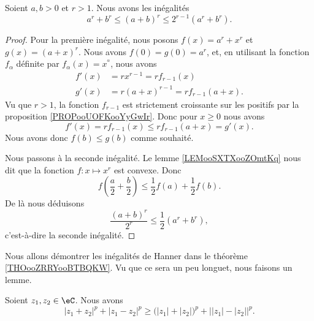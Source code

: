 	\begin{lemma}       \label{LEMooFKKEooDTypUd}
		Soient \( a,b>0\) et \( r>1\). Nous avons les inégalités
		\begin{equation}
			a^r+b^r\leq (a+b)^r\leq 2^{r-1}(a^r+b^r).
		\end{equation}
	\end{lemma}

	\begin{proof}
		Pour la première inégalité, nous posons \( f(x)=a^r+x^r\) et \( g(x)=(a+x)^r\). Nous avons \( f(0)=g(0)=a^r\), et, en utilisant la fonction \( f_{\alpha}\) définite par \( f_{\alpha}(x)=x^{^\alpha}\), nous avons
		\begin{subequations}
			\begin{align}
				f'(x) & =rx^{r-1} =rf_{r-1}(x)       \\
				g'(x) & =r(a+x)^{r-1}=rf_{r-1}(a+x).
			\end{align}
		\end{subequations}
		Vu que \( r>1\), la fonction \( f_{r-1}\) est strictement croissante sur les positifs par la proposition \ref{PROPooUOFKooYyGwIr}. Donc pour \( x\geq 0\) nous avons
		\begin{equation}
			f'(x)=rf_{r-1}(x)\leq rf_{r-1}(a+x)=g'(x).
		\end{equation}
		Nous avons donc \( f(b)\leq g(b)\) comme souhaité.

		Nous passons à la seconde inégalité. Le lemme \ref{LEMooSXTXooZOmtKq} nous dit que la fonction \( f\colon x\mapsto x^r \) est convexe. Donc
		\begin{equation}
			f\left( \frac{ a }{2}+\frac{ b }{2} \right)\leq\frac{ 1 }{2}f(a)+\frac{ 1 }{2}f(b).
		\end{equation}
		De là nous déduisons
		\begin{equation}
			\frac{ (a+b)^r }{ 2^r }\leq \frac{ 1 }{2}(a^r+b^r),
		\end{equation}
		c'est-à-dire la seconde inégalité.
	\end{proof}

	Nous allons démontrer les inégalités de Hanner dans le théorème \ref{THOooZRRYooBTBQKW}. Vu que ce sera un peu longuet, nous faisons un lemme.
	\begin{lemma}       \label{LEMooDHRCooQiSpyC}
		Soient \( z_1,z_2\in \eC\). Nous avons
		\begin{equation}        \label{EQooMUXVooSpGSyG}
			| z_1+z_2 |^p+| z_1-z_2 |^p\geq \big( | z_1 |+| z_2 | \big)^p+\big| | z_1 |-| z_2 | \big|^p.
		\end{equation}
	\end{lemma}

